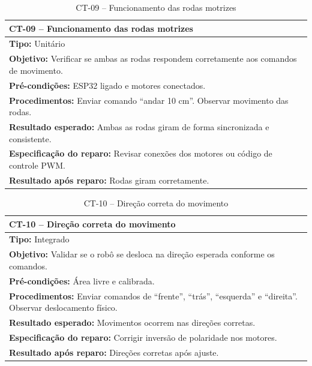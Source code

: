 
\begin{table}[H]
\centering
\begin{tabular}{|p{}|}
\hline
\textbf{CT-09 – Funcionamento das rodas motrizes} \\ \hline
\textbf{Tipo:} Unitário \\ \hline
\textbf{Objetivo:} Verificar se ambas as rodas respondem corretamente aos comandos de movimento. \\ \hline
\textbf{Pré-condições:} ESP32 ligado e motores conectados. \\ \hline
\textbf{Procedimentos:} Enviar comando “andar 10 cm”. Observar movimento das rodas. \\ \hline
\textbf{Resultado esperado:} Ambas as rodas giram de forma sincronizada e consistente. \\ \hline
\textbf{Especificação do reparo:} Revisar conexões dos motores ou código de controle PWM. \\ \hline
\textbf{Resultado após reparo:} Rodas giram corretamente. \\ \hline
\end{tabular}
\caption{CT-09 – Funcionamento das rodas motrizes}
\end{table}


\begin{table}[H]
\centering
\begin{tabular}{|p{}|}
\hline
\textbf{CT-10 – Direção correta do movimento} \\ \hline
\textbf{Tipo:} Integrado \\ \hline
\textbf{Objetivo:} Validar se o robô se desloca na direção esperada conforme os comandos. \\ \hline
\textbf{Pré-condições:} Área livre e calibrada. \\ \hline
\textbf{Procedimentos:} Enviar comandos de “frente”, “trás”, “esquerda” e “direita”. Observar deslocamento físico. \\ \hline
\textbf{Resultado esperado:} Movimentos ocorrem nas direções corretas. \\ \hline
\textbf{Especificação do reparo:} Corrigir inversão de polaridade nos motores. \\ \hline
\textbf{Resultado após reparo:} Direções corretas após ajuste. \\ \hline
\end{tabular}
\caption{CT-10 – Direção correta do movimento}
\end{table}

